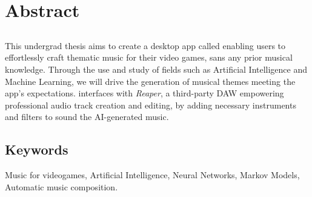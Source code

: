 \chapter*{Abstract}

\section*{\tituloPortadaEngVal}

This undergrad thesis aims to create a desktop app called \appName{} enabling users to effortlessly craft thematic music for their video games, sans any prior musical knowledge. Through the use and study of fields such as Artificial Intelligence and Machine Learning, we will drive the generation of musical themes meeting the app's expectations. \appName{} interfaces with \textit{Reaper}, a third-party DAW empowering professional audio track creation and editing, by adding necessary instruments and filters to sound the AI-generated music.


\section*{Keywords}

\noindent Music for videogames, Artificial Intelligence, Neural Networks, Markov Models, Automatic music composition.



